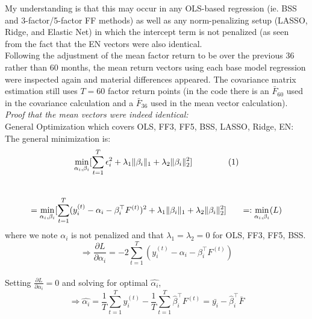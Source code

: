 \documentclass{article}
\begin{document}
My understanding is that this may occur in any OLS-based regression (ie. BSS and 3-factor/5-factor FF methods) as well as any norm-penalizing setup (LASSO, Ridge, and Elastic Net) in which the intercept term is not penalized (as seen from the fact that the EN vectors were also identical.\\

Following the adjustment of the mean factor return to be over the previous 36 rather than 60 months, the mean return vectors using each base model regression were inspected again and material differences appeared. The covariance matrix estimation still uses $T=60$ factor return points (in the code there is an $\bar{F}_{60}$ used in the covariance calculation and a $\bar{F}_{36}$ used in the mean vector calculation).\\

\emph{Proof that the mean vectors were indeed identical:}\\

General Optimization which covers OLS, FF3, FF5, BSS, LASSO, Ridge, EN:\\

The general minimization is:\\

\[ \min_{\alpha_i, \beta_i} [ \sum_{t=1}^T \epsilon_i^2 + \lambda_1 \|\beta_i\|_1 + \lambda_2 \|\beta_i\|_2^2 ] \hspace{15mm} (1) \] \\

\[ = \min_{\alpha_i, \beta_i} [ \sum_{t=1}^T (y_i^{(t)} - \alpha_i - \beta_i^{\top} F^{(t)})^2 + \lambda_1 \|\beta_{i}\|_1 + \lambda_2 \|\beta_{i}\|_2^2 ] \hspace{6mm} =:\min_{\alpha_i, \beta_i} (L) \] where we note $\alpha_i$ is not penalized and that $\lambda_1 = \lambda_2 = 0$ for OLS, FF3, FF5, BSS.\\

\[ \Rightarrow \frac{\partial L }{\partial \alpha_i } = -2 \sum_{t=1}^T (y_i^{(t)} - \alpha_i - \beta_i^{\top} F^{(t)}) \] \\

Setting $\frac{\partial L}{\partial \alpha_i} = 0$ and solving for optimal $\hat{\alpha_i}$, \\

\[ \Rightarrow \hat{\alpha_i} = \frac{1}{T} \sum_{t=1}^{T} y_i^{(t)} - \frac{1}{T} \sum_{t=1}^T \hat{\beta}_i^{\top} F^{(t)} = \bar{y_i} - \hat{\beta}_i^{\top} \bar{F} \] \\
\end{document}
